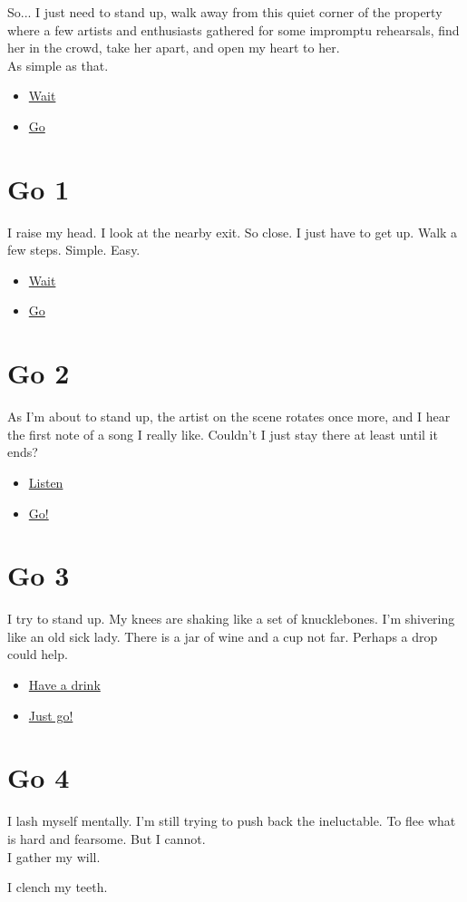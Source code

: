 \documentclass{report}
\newcommand{\glink}[2]{
	\hyperref[#1]{#2}
}
\newcommand{\gsection}[1]{
	\section*{#1}
	\label{#1}
}
\begin{document}
So... I just need to stand up, walk away from this quiet corner of the property where a few artists and enthusiasts gathered for some impromptu rehearsals, find her in the crowd, take her apart, and open my heart to her.\\

As simple as that.

\begin{itemize}
	\item \glink{Wait 1}{Wait}
	\item \glink{Go 1}{Go}
\end{itemize}

\gsection{Go 1}

I raise my head. I look at the nearby exit. So close. I just have to get up. Walk a few steps. Simple. Easy.

\begin{itemize}
	\item \glink{Wait 1}{Wait}
	\item \glink{Go 2}{Go}
\end{itemize}

\gsection{Go 2}

As I'm about to stand up, the artist on the scene rotates once more, and I hear the first note of a song I really like. Couldn't I just stay there at least until it ends?

\begin{itemize}
	\item \glink{Wait 1}{Listen}
	\item \glink{Go 3}{Go!}
\end{itemize}

\gsection{Go 3}

I try to stand up. My knees are shaking like a set of knucklebones. I'm shivering like an old sick lady. There is a jar of wine and a cup not far. Perhaps a drop could help.

\begin{itemize}
	\item \glink{Wait 1}{Have a drink}
	\item \glink{Go 3}{Just go!}
\end{itemize}

\gsection{Go 4}

I lash myself mentally. I'm still trying to push back the ineluctable. To flee what is hard and fearsome. But I cannot.\\

I gather my will.

I clench my teeth.
\end{document}
